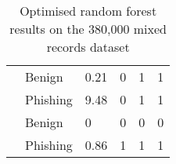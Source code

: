 \begin{singlespace}
\begin{table}[h!]
\begin{center}
\begin{tabular}{ m{7.9em} m{3.8em} m{3.4em} m{3.3em} m{7em} m{7em}}
				       & Benign         & 0.21             & 0               & 1                        & 1                        \\ & Phishing &9.48 &  0&1 &1     \\  \addlinespace  \addlinespace

				    & Benign         & 0                & 0               & 0                        & 0                        \\ & Phishing &0.86 &  1&1 & 1     \\\bottomrule
			\end{tabular}
			\captionsetup{type=table}\caption{ Optimised random forest results on the 380,000 mixed records dataset}
			\label{tab:FINAL_MODEL}
		\end{center}
	\end{table}
\end{singlespace}
